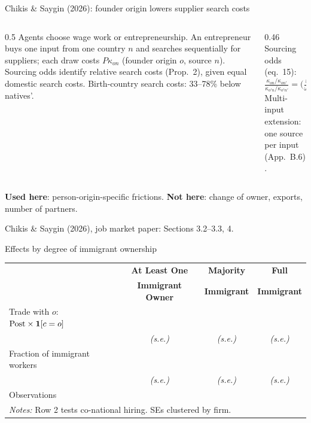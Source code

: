 \documentclass[notes,11pt, aspectratio=169]{beamer}
\newcommand{\src}[1]{\par\vfill{\scriptsize\color{gray}#1\par}}
\newcommand{\Post}{\mathrm{Post}}
\begin{document}
\begin{frame}[label=app-cs]{Chikis \& Saygin (2026): founder origin lowers supplier search costs}
\begin{columns}[T]
\begin{column}{0.5\textwidth}
\small
Agents choose wage work or entrepreneurship. An entrepreneur buys one input from one country $n$ and searches sequentially for suppliers; each draw costs $P\kappa_{on}$ (founder origin $o$, source $n$). Sourcing odds identify relative search costs (Prop.\ 2), given equal domestic search costs. Birth-country search costs: 33--78\% below natives'.
\end{column}
\begin{column}{0.46\textwidth}
\footnotesize
Sourcing odds (eq.\ 15):
\[
\tfrac{\kappa_{on}/\kappa_{on'}}{\kappa_{o'n}/\kappa_{o'n'}}=\Big(\tfrac{\omega_{on}/\omega_{on'}}{\omega_{o'n}/\omega_{o'n'}}\Big)^{-\theta/\eta}
\]
Multi-input extension: one source per input (App.\ B.6).
\end{column}
\end{columns}
\small
\textbf{Used here}: person-origin-specific frictions. \textbf{Not here}: change of owner, exports, number of partners.
\src{Chikis \& Saygin (2026), job market paper: Sections 3.2--3.3, 4. \hyperlink{compare}{\beamerreturnbutton{Back}}}
\end{frame}


\begin{frame}[label=app-degree]{Effects by degree of immigrant ownership}
\begin{table}[h]
\centering
\renewcommand{\arraystretch}{1.3}
\footnotesize
\begin{tabular}{lccc}
\toprule
 & \textbf{At Least One} & \textbf{Majority} & \textbf{Full} \\
 & \textbf{Immigrant Owner} & \textbf{Immigrant} & \textbf{Immigrant} \\
\midrule
Trade with $o$: $\Post\times\mathbbm{1}[c=o]$ & & & \\
 & \textit{(s.e.)} & \textit{(s.e.)} & \textit{(s.e.)} \\
Fraction of immigrant workers & & & \\
 & \textit{(s.e.)} & \textit{(s.e.)} & \textit{(s.e.)} \\
\midrule
Observations & & & \\
\bottomrule
\multicolumn{4}{l}{\scriptsize \textit{Notes:} Row 2 tests co-national hiring. SEs clustered by firm.} \\
\end{tabular}
\end{table}
\hyperlink{preview}{}
\end{frame}
\end{document}
